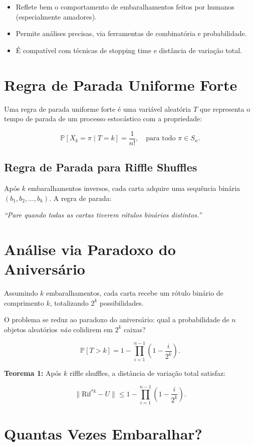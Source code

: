 \documentclass[12pt]{article}
\begin{document}
\begin{itemize}
    \item Reflete bem o comportamento de embaralhamentos feitos por humanos (especialmente amadores).
    \item Permite análises precisas, via ferramentas de combinatória e probabilidade.
    \item É compatível com técnicas de stopping time e distância de variação total.
\end{itemize}


\section{Regra de Parada Uniforme Forte}

Uma regra de parada uniforme forte é uma variável aleatória $T$ que representa o tempo de parada de um processo estocástico com a propriedade:

\[
\mathbb{P}[X_k = \pi \mid T = k] = \frac{1}{n!}, \quad \text{para todo } \pi \in S_n.
\]

\subsection*{Regra de Parada para Riffle Shuffles}

Após $k$ embaralhamentos inversos, cada carta adquire uma sequência binária $(b_1, b_2, \ldots, b_k)$. A regra de parada:

\textit{``Pare quando todas as cartas tiverem rótulos binários distintos.''}

\section{Análise via Paradoxo do Aniversário}

Assumindo $k$ embaralhamentos, cada carta recebe um rótulo binário de comprimento $k$, totalizando $2^k$ possibilidades.

O problema se reduz ao paradoxo do aniversário: qual a probabilidade de $n$ objetos aleatórios \emph{não} colidirem em $2^k$ caixas?

\[
\mathbb{P}[T > k] = 1 - \prod_{i=1}^{n-1}\left(1 - \frac{i}{2^k}\right).
\]

\textbf{Teorema 1:} Após $k$ riffle shuffles, a distância de variação total satisfaz:

\[
\| \text{Rif}^{*k} - U \| \leq 1 - \prod_{i=1}^{n-1}\left(1 - \frac{i}{2^k}\right).
\]

\section{Quantas Vezes Embaralhar?}
\end{document}

